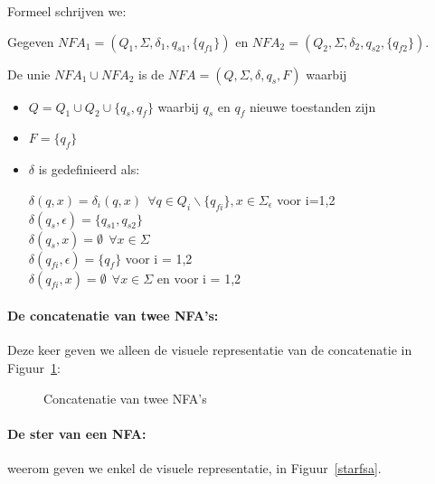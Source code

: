 Formeel schrijven we:

Gegeven $NFA_1 = (Q_1,\Sigma,\delta_1,q_{s1},\{q_{f1}\})$ en 
%
$NFA_2 = (Q_2,\Sigma,\delta_2,q_{s2},\{q_{f2}\})$.

De unie $NFA_1 \cup NFA_2$ is de $NFA = (Q,\Sigma,\delta,q_s,F)$
waarbij
\begin{itemize}
\item $Q = Q_1 \cup Q_2 \cup \{q_s,q_f\}$ waarbij $q_s$ en $q_f$
nieuwe toestanden zijn
\item $F = \{q_f\}$
\item $\delta$ is gedefinieerd als:

 $\delta(q,x) = \delta_i(q,x)~~\forall q \in Q_i \backslash \{q_{fi}\}, x \in \Sigma_\epsilon$ voor i=1,2 \\
 $\delta(q_s,\epsilon) = \{q_{s1}, q_{s2}\}$ \\
 $\delta(q_s,x) = \emptyset ~~\forall x \in \Sigma$ \\
 $\delta(q_{fi},\epsilon) = \{q_f\}$ voor i = 1,2 \\
 $\delta(q_{fi}, x) = \emptyset ~~\forall x \in \Sigma$ en voor i = 1,2
\end{itemize}


\paragraph{De concatenatie van twee NFA's:} Deze keer geven we alleen
de visuele representatie van de concatenatie in Figuur~\ref{concatfsa}:

\begin{figure}[h]
\caption{Concatenatie van twee NFA's\label{concatfsa}}
\end{figure}

\clearpage
\paragraph{De ster van een NFA:} weerom geven we enkel de visuele
representatie, in Figuur~\ref{starfsa}.

